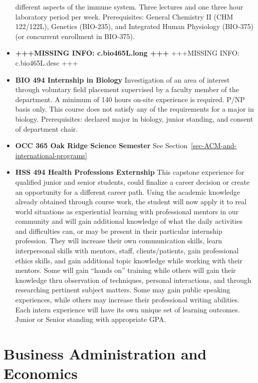 \documentclass[
  letterpaper,
]{scrbook}
\begin{document}
\begin{itemize}
  different aspects of the immune system. Three lectures and one three
  hour laboratory period per week. Prerequisites: General Chemistry II
  (CHM 122/122L), Genetics (BIO-235), and Integrated Human Physiology
  (BIO-375) (or concurrent enrollment in BIO-375).
\item
  \textbf{+++MISSING INFO: c.bio465L.long +++} +++MISSING INFO:
  c.bio465L.desc +++
\item
  \textbf{BIO 494 Internship in Biology} Investigation of an area of
  interest through voluntary field placement supervised by a faculty
  member of the department. A minimum of 140 hours on-site experience is
  required. P/NP basis only. This course does not satisfy any of the
  requirements for a major in biology. Prerequisites: declared major in
  biology, junior standing, and consent of department chair.
\item
  \textbf{OCC 365 Oak Ridge Science Semester} See
  Section~\ref{sec-ACM-and-international-programs}
\item
  \textbf{HSS 494 Health Professions Externship} This capstone
  experience for qualified junior and senior students, could finalize a
  career decision or create an opportunity for a different career path.
  Using the academic knowledge already obtained through course work, the
  student will now apply it to real world situations as experiential
  learning with professional mentors in our community and will gain
  additional knowledge of what the daily activities and difficulties
  can, or may be present in their particular internship profession. They
  will increase their own communication skills, learn interpersonal
  skills with mentors, staff, clients/patients, gain professional ethics
  skills, and gain additional topic knowledge while working with their
  mentors. Some will gain ``hands on'' training while others will gain
  their knowledge thru observation of techniques, personal interactions,
  and through researching pertinent subject matters. Some may gain
  public speaking experiences, while others may increase their
  professional writing abilities. Each intern experience will have its
  own unique set of learning outcomes. Junior or Senior standing with
  appropriate GPA.
\end{itemize}

\section{Business Administration and
Economics}\label{sec-business-administration-and-economics}
\end{document}
